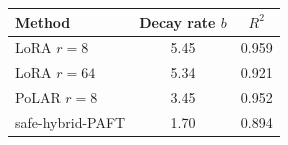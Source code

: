 \begin{tabular}{lcc}
\toprule
\textbf{Method} & \textbf{Decay rate $b$} & $R^2$ \\
\midrule
LoRA $r{=}8$ & 5.45 & 0.959 \\
LoRA $r{=}64$ & 5.34 & 0.921 \\
PoLAR $r{=}8$ & 3.45 & 0.952 \\
safe-hybrid-PAFT & 1.70 & 0.894 \\
\bottomrule
\end{tabular}